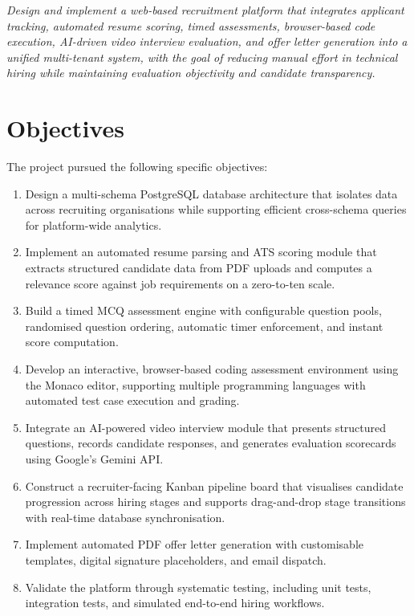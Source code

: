 \textit{Design and implement a web-based recruitment platform that integrates applicant tracking, automated resume scoring, timed assessments, browser-based code execution, AI-driven video interview evaluation, and offer letter generation into a unified multi-tenant system, with the goal of reducing manual effort in technical hiring while maintaining evaluation objectivity and candidate transparency.}

\section{Objectives}
\label{sec:objectives}

The project pursued the following specific objectives:

\begin{enumerate}[label=\textbf{O\arabic*.}, leftmargin=1.8em]
  \item Design a multi-schema PostgreSQL database architecture that isolates data across recruiting organisations while supporting efficient cross-schema queries for platform-wide analytics.
  \item Implement an automated resume parsing and ATS scoring module that extracts structured candidate data from PDF uploads and computes a relevance score against job requirements on a zero-to-ten scale.
  \item Build a timed MCQ assessment engine with configurable question pools, randomised question ordering, automatic timer enforcement, and instant score computation.
  \item Develop an interactive, browser-based coding assessment environment using the Monaco editor, supporting multiple programming languages with automated test case execution and grading.
  \item Integrate an AI-powered video interview module that presents structured questions, records candidate responses, and generates evaluation scorecards using Google's Gemini API.
  \item Construct a recruiter-facing Kanban pipeline board that visualises candidate progression across hiring stages and supports drag-and-drop stage transitions with real-time database synchronisation.
  \item Implement automated PDF offer letter generation with customisable templates, digital signature placeholders, and email dispatch.
  \item Validate the platform through systematic testing, including unit tests, integration tests, and simulated end-to-end hiring workflows.
\end{enumerate}

